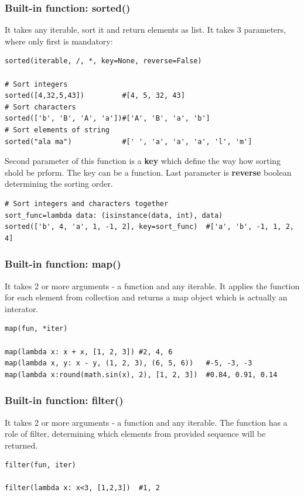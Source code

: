 \documentclass{article}
\begin{document}
	\subsubsection{Built-in function: sorted()}
	It takes any iterable, sort it and return elements as list. It takes 3 parameters, where only first is mandatory: 
	\begin{lstlisting}[style=pystyle]
sorted(iterable, /, *, key=None, reverse=False)

# Sort integers
sorted([4,32,5,43])			#[4, 5, 32, 43] 
# Sort characters
sorted(['b', 'B', 'A', 'a'])#['A', 'B', 'a', 'b'] 
# Sort elements of string
sorted("ala ma")			#[' ', 'a', 'a', 'a', 'l', 'm']
	\end{lstlisting}
	Second parameter of this function is a \textbf{key} which define the way how sorting shold be prform. The key can be a function. Last parameter is \textbf{reverse} boolean determining the sorting order. 
	\begin{lstlisting}[style=pystyle]
# Sort integers and characters together
sort_func=lambda data: (isinstance(data, int), data)
sorted(['b', 4, 'a', 1, -1, 2], key=sort_func)	#['a', 'b', -1, 1, 2, 4]
	\end{lstlisting}
	
	
	\subsubsection{Built-in function: map()}
	It takes 2 or more arguments - a function and any iterable. It applies the function for each element from collection and returns a map object which is actually an interator.  
\begin{lstlisting}[style=pystyle]
map(fun, *iter)

map(lambda x: x + x, [1, 2, 3])	#2, 4, 6
map(lambda x, y: x - y, (1, 2, 3), (6, 5, 6))	#-5, -3, -3
map(lambda x:round(math.sin(x), 2), [1, 2, 3])	#0.84, 0.91, 0.14
\end{lstlisting}
	

	\subsubsection{Built-in function: filter()}
	It takes 2 or more arguments - a function and any iterable. The function has a role of filter, determining which elements from provided sequence will be returned.  
\begin{lstlisting}[style=pystyle]
filter(fun, iter)

filter(lambda x: x<3, [1,2,3])	#1, 2
\end{lstlisting}
\end{document}
